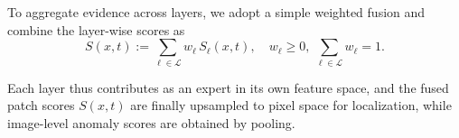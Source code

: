 \documentclass{article}
\theoremstyle{plain}
\theoremstyle{definition}
\theoremstyle{remark}
\begin{document}
To aggregate evidence across layers, we adopt a simple weighted fusion and combine the layer-wise scores as
\begin{equation}
S(x,t)
:=
\sum_{\ell \in \mathcal{L}} w_\ell \, S_\ell(x,t),
\quad
w_\ell \ge 0,\ \sum_{\ell \in \mathcal{L}} w_\ell = 1.
\end{equation}

Each layer thus contributes as an expert in its own feature space, and the fused patch scores $S(x,t)$ are finally upsampled to pixel space for localization, while image-level anomaly scores are obtained by pooling.






\end{document}
